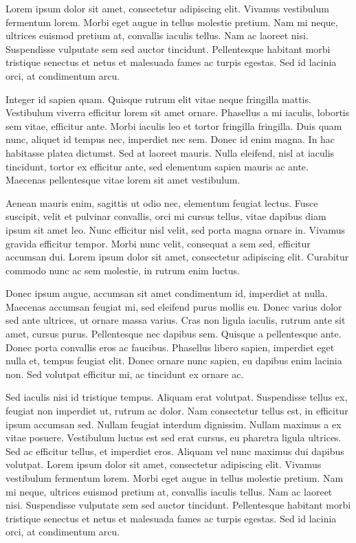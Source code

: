 \documentclass[12pt,a4paper,article]{memoir} %
\title{}
\author{}
\date{} %
\begin{document}
Lorem ipsum dolor sit amet, consectetur adipiscing elit. Vivamus vestibulum fermentum lorem. Morbi eget augue in tellus molestie pretium. Nam mi neque, ultrices euismod pretium at, convallis iaculis tellus. Nam ac laoreet nisi. Suspendisse vulputate sem sed auctor tincidunt. Pellentesque habitant morbi tristique senectus et netus et malesuada fames ac turpis egestas. Sed id lacinia orci, at condimentum arcu.

Integer id sapien quam. Quisque rutrum elit vitae neque fringilla mattis. Vestibulum viverra efficitur lorem sit amet ornare. Phasellus a mi iaculis, lobortis sem vitae, efficitur ante. Morbi iaculis leo et tortor fringilla fringilla. Duis quam nunc, aliquet id tempus nec, imperdiet nec sem. Donec id enim magna. In hac habitasse platea dictumst. Sed at laoreet mauris. Nulla eleifend, nisl at iaculis tincidunt, tortor ex efficitur ante, sed elementum sapien mauris ac ante. Maecenas pellentesque vitae lorem sit amet vestibulum.

Aenean mauris enim, sagittis ut odio nec, elementum feugiat lectus. Fusce suscipit, velit et pulvinar convallis, orci mi cursus tellus, vitae dapibus diam ipsum sit amet leo. Nunc efficitur nisl velit, sed porta magna ornare in. Vivamus gravida efficitur tempor. Morbi nunc velit, consequat a sem sed, efficitur accumsan dui. Lorem ipsum dolor sit amet, consectetur adipiscing elit. Curabitur commodo nunc ac sem molestie, in rutrum enim luctus.

Donec ipsum augue, accumsan sit amet condimentum id, imperdiet at nulla. Maecenas accumsan feugiat mi, sed eleifend purus mollis eu. Donec varius dolor sed ante ultrices, ut ornare massa varius. Cras non ligula iaculis, rutrum ante sit amet, cursus purus. Pellentesque nec dapibus sem. Quisque a pellentesque ante. Donec porta convallis eros ac faucibus. Phasellus libero sapien, imperdiet eget nulla et, tempus feugiat elit. Donec ornare nunc sapien, eu dapibus enim lacinia non. Sed volutpat efficitur mi, ac tincidunt ex ornare ac.

Sed iaculis nisi id tristique tempus. Aliquam erat volutpat. Suspendisse tellus ex, feugiat non imperdiet ut, rutrum ac dolor. Nam consectetur tellus est, in efficitur ipsum accumsan sed. Nullam feugiat interdum dignissim. Nullam maximus a ex vitae posuere. Vestibulum luctus est sed erat cursus, eu pharetra ligula ultrices. Sed ac efficitur tellus, et imperdiet eros. Aliquam vel nunc maximus dui dapibus volutpat.
\newpage
Lorem ipsum dolor sit amet, consectetur adipiscing elit. Vivamus vestibulum fermentum lorem. Morbi eget augue in tellus molestie pretium. Nam mi neque, ultrices euismod pretium at, convallis iaculis tellus. Nam ac laoreet nisi. Suspendisse vulputate sem sed auctor tincidunt. Pellentesque habitant morbi tristique senectus et netus et malesuada fames ac turpis egestas. Sed id lacinia orci, at condimentum arcu.
\end{document}
